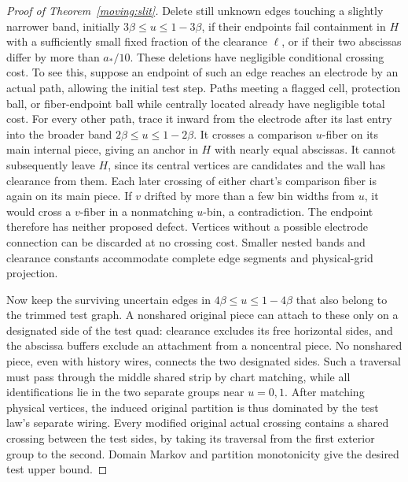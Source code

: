 \begin{proof}[Proof of Theorem~\ref{moving:slit}]
Delete still unknown edges touching a slightly narrower band,
initially $3\beta\le u\le1-3\beta$, if their endpoints fail containment
in $H$ with a sufficiently small fixed fraction of the clearance
$\ell$, or if their two abscissas differ by more than $a_*/10$.
These deletions have negligible conditional crossing cost.  To see
this, suppose an endpoint of such an edge reaches an electrode by
an actual path, allowing the initial test step.  Paths meeting a
flagged cell, protection ball, or fiber-endpoint ball while centrally
located already have negligible total cost.  For every other path,
trace it inward from the electrode after its last entry into the
broader band $2\beta\le u\le1-2\beta$.  It crosses a comparison
$u$-fiber on its main internal piece, giving an anchor in $H$ with
nearly equal abscissas.  It cannot subsequently leave $H$, since its
central vertices are candidates and the wall has clearance from
them.  Each later crossing of either chart's comparison fiber is
again on its main piece.  If $v$ drifted by more than a few bin
widths from $u$, it would cross a $v$-fiber in a nonmatching $u$-bin,
a contradiction.  The endpoint therefore has neither proposed
defect.  Vertices without a possible electrode connection can be
discarded at no crossing cost.  Smaller nested bands and clearance
constants accommodate complete edge segments and physical-grid
projection.

Now keep the surviving uncertain edges in
$4\beta\le u\le1-4\beta$ that also belong to the trimmed test graph.
A nonshared original piece can attach to these only on a designated
side of the test quad: clearance excludes its free horizontal sides,
and the abscissa buffers exclude an attachment from a noncentral
piece.  No nonshared piece, even with history wires, connects the
two designated sides.  Such a traversal must pass through the middle
shared strip by chart matching, while all identifications lie in the
two separate groups near $u=0,1$.  After matching physical vertices,
the induced original partition is thus dominated by the test law's
separate wiring.  Every modified original actual crossing contains
a shared crossing between the test sides, by taking its traversal
from the first exterior group to the second.  Domain Markov and
partition monotonicity give the desired test upper bound.


\end{proof}
